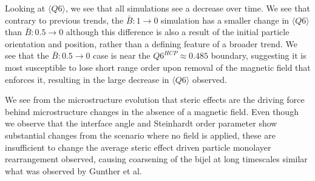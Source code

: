 Looking at $\langle Q6 \rangle$, we see that all simulations see a
decrease over time. We see that contrary to previous trends, the
\(\bar{B}: 1\rightarrow 0\) simulation has a smaller change in
$\langle Q6 \rangle$ than \(\bar{B}: 0.5\rightarrow 0\) although this
difference is also a result of the initial particle orientation and
position, rather than a defining feature of a broader trend. We see that
the \(\bar{B}: 0.5\rightarrow 0\) case is near the
\(Q6^{HCP} \approx 0.485\) boundary, suggesting it is most susceptible
to lose short range order upon removal of the magnetic field that
enforces it, resulting in the large decrease in $\langle Q6 \rangle$
observed.

We see from the microstructure evolution that steric effects are the
driving force behind microstructure changes in the absence of a magnetic
field. Even though we observe that the interface angle and Steinhardt
order parameter show substantial changes from the scenario where no
field is applied, these are insufficient to change the average steric
effect driven particle monolayer rearrangement observed, causing
coarsening of the bijel at long timescales similar what was observed by
Gunther et al.~\cite{gunther_timescales_2014}
